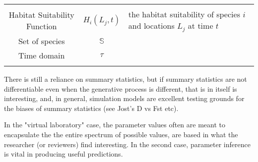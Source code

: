 \documentclass[]{article}
\begin{document}
\begin{longtable}[]{@{}ccl@{}}
\begin{minipage}[t]{0.42\columnwidth}
\strut
\end{minipage}\tabularnewline
\begin{minipage}[t]{0.25\columnwidth}\centering
Habitat Suitability Function\strut
\end{minipage} & \begin{minipage}[t]{0.23\columnwidth}\centering
\(H_i(L_j,t)\)\strut
\end{minipage} & \begin{minipage}[t]{0.42\columnwidth}\raggedright
the habitat suitability of species \(i\) and locations \(L_j\) at time
\(t\)\strut
\end{minipage}\tabularnewline
\begin{minipage}[t]{0.25\columnwidth}\centering
Set of species\strut
\end{minipage} & \begin{minipage}[t]{0.23\columnwidth}\centering
\(\mathbb{S}\)\strut
\end{minipage} & \begin{minipage}[t]{0.42\columnwidth}\raggedright
\strut
\end{minipage}\tabularnewline
\begin{minipage}[t]{0.25\columnwidth}\centering
Time domain\strut
\end{minipage} & \begin{minipage}[t]{0.23\columnwidth}\centering
\(\tau\)\strut
\end{minipage} & \begin{minipage}[t]{0.42\columnwidth}\raggedright
\strut
\end{minipage}\tabularnewline
\begin{minipage}[t]{0.25\columnwidth}\centering
\strut
\end{minipage} & \begin{minipage}[t]{0.23\columnwidth}\centering
\strut
\end{minipage} & \begin{minipage}[t]{0.42\columnwidth}\raggedright
\strut
\end{minipage}\tabularnewline
\bottomrule
\end{longtable}

%
%
%
\clearpage
{
\footnotesize

}
There is still a reliance on summary statistics, but if summary
statistics are not differentiable even when the  generative process is
different, that is in itself is interesting, and, in general, simulation
models are excellent testing grounds for the biases of summary
statistics (see Jost's D vs Fst etc).

In the "virtual laboratory" case, the parameter values often are meant
to encapsulate the the entire spectrum of possible values, are based in
what the researcher (or reviewers) find interesting. In the second case,
parameter inference is vital in producing useful predictions.
\end{document}
